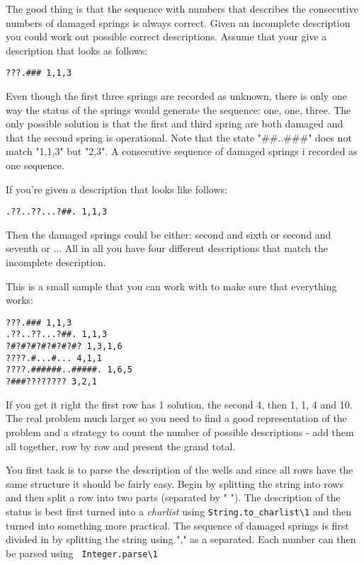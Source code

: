 \documentclass[a4paper,11pt]{article}
\begin{document}
The good thing is that the sequence with numbers that describes the
consecutive numbers of damaged springs is always correct. Given an
incomplete description you could work out possible correct descriptions. 
Assume that your give a description that looks as follows:

\begin{verbatim}
???.### 1,1,3
\end{verbatim}

Even though the first three springs are recorded as unknown, there is
only one way the status of the springs would generate the sequence:
one, one, three. The only possible solution is that the first and
third spring are both damaged and that the second spring is
operational.  Note that the state "\#\#..\#\#\#" does not match
"1,1,3" but "2,3". A consecutive sequence of damaged springs i
recorded as one sequence.

If you're given a description that looks like follows:

\begin{verbatim}
.??..??...?##. 1,1,3
\end{verbatim}

Then the damaged springs could be either: second and sixth or second
and seventh or ... All in all you have four different descriptions
that match the incomplete description.

This is a small sample that you can work with to make sure that
everything works:

\begin{verbatim}
???.### 1,1,3
.??..??...?##. 1,1,3
?#?#?#?#?#?#?#? 1,3,1,6
????.#...#... 4,1,1
????.######..#####. 1,6,5
?###???????? 3,2,1
\end{verbatim}

If you get it right the first row has 1 solution, the second 4, then
1, 1, 4 and 10. The real problem much larger so you need to find a
good representation of the problem and a strategy to count the number
of possible descriptions - add them all together, row by row and
present the grand total.

You first task is to parse the description of the wells and since all
rows have the same structure it should be fairly easy. Begin by
splitting the string into rows and then split a row into two parts
(separated by " "). The description of the status is best first turned
into a {\em charlist} using {\tt String.to_charlist\textbackslash 1}
and then turned into something more practical. The sequence of damaged
springs is first divided in by splitting the string using "," as a
separated. Each number can then be parsed using {\tt
  Integer.parse\textbackslash 1}
\end{document}

